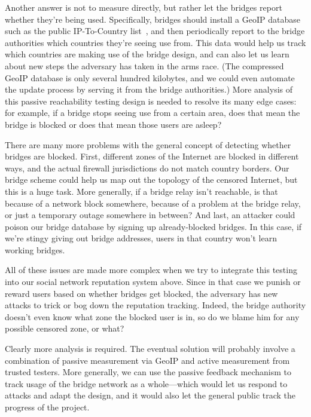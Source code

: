 \documentclass{llncs}
\begin{document}
Another answer is not to measure directly, but rather let the bridges
report whether they're being used.
Specifically, bridges should install a GeoIP database such as the public
IP-To-Country list~\cite{ip-to-country}, and then periodically report to the
bridge authorities which countries they're seeing use from. This data
would help us track which countries are making use of the bridge design,
and can also let us learn about new steps the adversary has taken in
the arms race. (The compressed GeoIP database is only several hundred
kilobytes, and we could even automate the update process by serving it
from the bridge authorities.)
More analysis of this passive reachability
testing design is needed to resolve its many edge cases: for example,
if a bridge stops seeing use from a certain area, does that mean the
bridge is blocked or does that mean those users are asleep?

There are many more problems with the general concept of detecting whether
bridges are blocked. First, different zones of the Internet are blocked
in different ways, and the actual firewall jurisdictions do not match
country borders. Our bridge scheme could help us map out the topology
of the censored Internet, but this is a huge task. More generally,
if a bridge relay isn't reachable, is that because of a network block
somewhere, because of a problem at the bridge relay, or just a temporary
outage somewhere in between? And last, an attacker could poison our
bridge database by signing up already-blocked bridges. In this case,
if we're stingy giving out bridge addresses, users in that country won't
learn working bridges.

All of these issues are made more complex when we try to integrate this
testing into our social network reputation system above.
Since in that case we punish or reward users based on whether bridges
get blocked, the adversary has new attacks to trick or bog down the
reputation tracking. Indeed, the bridge authority doesn't even know
what zone the blocked user is in, so do we blame him for any possible
censored zone, or what?

Clearly more analysis is required. The eventual solution will probably
involve a combination of passive measurement via GeoIP and active
measurement from trusted testers.  More generally, we can use the passive
feedback mechanism to track usage of the bridge network as a whole---which
would let us respond to attacks and adapt the design, and it would also
let the general public track the progress of the project.
\end{document}
